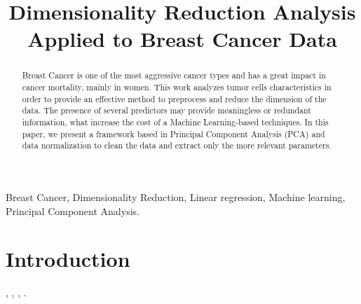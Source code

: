 \documentclass[conference]{IEEEtran}
\begin{document}
\title{Dimensionality Reduction Analysis Applied to Breast Cancer Data}

\author{
\and
{}
}

\maketitle

\begin{abstract}
Breast Cancer is one of the most aggressive cancer types and has a great impact in cancer mortality, mainly in women. This work analyzes tumor cells characteristics in order to provide an effective method to preprocess and reduce the dimension of the data. The presence of several predictors may provide meaningless or redundant information, what increase the cost of a Machine Learning-based techniques. In this paper, we present a framework based in Principal Component Analysis (PCA) and data normalization to clean the data and extract only the more relevant parameters.

\end{abstract}

\begin{IEEEkeywords}
Breast Cancer, Dimensionality Reduction, Linear regression, Machine learning, Principal Component Analysis.
\end{IEEEkeywords}

\section{Introduction}

\cite{Kuhn2013}, \cite{Hastie2009}, \cite{Street1993}, \cite{Abdi2010}.
\end{document}
